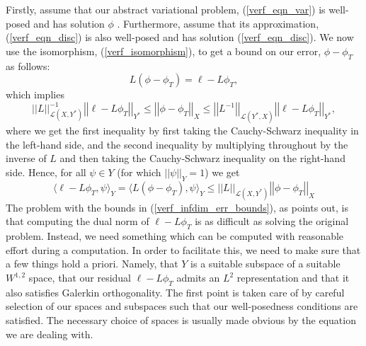 \documentclass[12pt,a4paper]{article}
\theoremstyle{definition}
\begin{document}
Firstly, assume that  our abstract variational problem, (\ref{verf_eqn_var}) is well-posed and has solution $\phi$ .  Furthermore, assume that its approximation, (\ref{verf_eqn_disc}) is also well-posed and has solution (\ref{verf_eqn_disc}). We now use the isomorphism,  (\ref{verf_isomorphism}), to get a bound on our error, $\phi-\phi_T$ as follows:
\begin{equation}
L\left(\phi-\phi_T\right)=\ell -L\phi_T,
\end{equation}
which implies
\begin{equation}\label{verf_infdim_err_bounds}
\left|\left|L\right|\right|^{-1}_{\mathcal{L}\left(X,Y^*\right)}\left|\left|\ell-L\phi_T\right|\right|_{Y^*}\leq \left|\left|\phi-\phi_T\right|\right|_X \leq \left|\left|L^{-1}\right|\right|_{\mathcal{L}\left(Y^*,X\right)}\left|\left|\ell-L\phi_T\right|\right|_{Y^*},
\end{equation}
where we get the first inequality by first taking the Cauchy-Schwarz inequality in the left-hand side, and the second inequality by multiplying throughout by the inverse of $L$ and then taking the Cauchy-Schwarz inequality on the right-hand side.  Hence, for all $\psi \in Y$ (for which $\left|\left|\psi\right|\right|_Y=1$) we get 
\begin{equation}
\langle\ell -L\phi_T,\psi \rangle_Y=\langle L\left( \phi-\phi_T\right),\psi \rangle_Y\leq \left|\left|L\right|\right|_{\mathcal{L}\left(X,Y^*\right)}\left|\left|\phi-\phi_T\right|\right|_X
\end{equation}
The problem with the bounds in (\ref{verf_infdim_err_bounds}), as \cite{verfurth2013posteriori} points out, is that computing the dual norm of $\ell-L\phi_T$ is as difficult as solving the original problem.  Instead, we need something which can be computed with reasonable effort during a computation.   In order to facilitate this, we need to make sure that a few things hold a priori. Namely, that $Y$ is a suitable subspace of a suitable $W^{1,2}$ space,
that our residual $\ell - L\phi_T$ admits an $L^2$ representation and that it also satisfies Galerkin orthogonality.  The first point is taken care of by careful selection of our spaces and subspaces such that our well-posedness conditions are satisfied.  The necessary choice of spaces is usually made obvious by the equation we are dealing with.  
\end{document}
